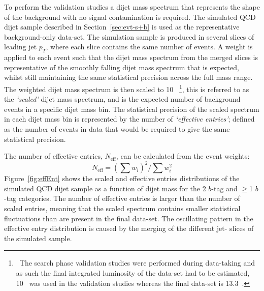 To perform the validation studies a dijet mass spectrum that represents the shape of the background with no signal contamination is required.
The simulated QCD dijet sample described in Section~\ref{sec:evt-s+b} is used as the representative background-only data-set.
The simulation sample is produced in several slices of leading jet $p_{T}$, where each slice contains the same number of events.
A weight is applied to each event such that the dijet mass spectrum from the merged slices is representative of the smoothly falling dijet mass spectrum that is expected,
whilst still maintaining the same statistical precision across the full mass range.
The weighted dijet mass spectrum is then scaled to 10~\ifb{}
\footnote{
  \ The search phase validation studies were performed during data-taking
  and as such the final integrated luminosity of the data-set had to be estimated,
  10~\ifb{} was used in the validation studies whereas the final data-set is 13.3~\ifb{}.
},
this is referred to as the \textit{`scaled'} dijet mass spectrum, and is the expected number of background events in a specific dijet mass bin. 
The statistical precision of the scaled spectrum in each dijet mass bin is represented by the number of \textit{`effective entries'};
defined as the number of events in data that would be required to give the same statistical precision.

\noindent
The number of effective entries, $N_{\text{eff}}$, can be calculated from the event weights:
\begin{equation}
  N_{\text{eff}} = (\sum{w_i})^2 / \sum{w_i^2}
  \label{eq:effEnt}
\end{equation}
Figure~\ref{fig:effEnt} shows the scaled and effective entries distributions of the simulated QCD dijet sample
as a function of dijet mass for the 2 $b$-tag and $\geq$1 $b$-tag categories.
The number of effective entries is larger than the number of scaled entries,
meaning that the scaled spectrum contains smaller statistical fluctuations than are present in the final data-set.
The oscillating pattern in the effective entry distribution is caused by the merging of the different jet-\pT{} slices of the simulated sample. 

